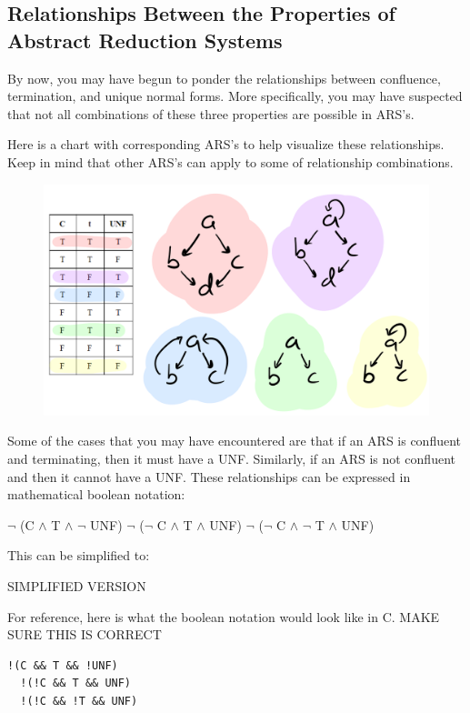 \documentclass{article}
\begin{document}
{\subsection{Relationships Between the Properties of Abstract Reduction Systems}

\medskip\noindent
By now, you may have begun to ponder the relationships between confluence, termination, and unique normal forms. More specifically, you may have suspected that not all combinations of these three properties are possible in ARS’s.

\medskip\noindent
Here is a chart with corresponding ARS's to help visualize these relationships. Keep in mind that other ARS's can apply to some of relationship combinations.

\begin{figure}[h!]
  \centering
  \includegraphics[scale=0.06]{arsComparisonGen}
\end{figure}

\medskip\noindent
Some of the cases that you may have encountered are that if an ARS is confluent and terminating, then it must have a UNF. Similarly, if an ARS is not confluent and then it cannot have a UNF. These relationships can be expressed in mathematical boolean notation:

$\neg$ (C $\land$ T $\land$ $\neg$ UNF)
$\neg$ ($\neg$ C $\land$ T $\land$ UNF)
$\neg$ ($\neg$ C $\land$ $\neg$ T $\land$ UNF)

\medskip\noindent
This can be simplified to:

SIMPLIFIED VERSION

\medskip\noindent
For reference, here is what the boolean notation would look like in C. MAKE SURE THIS IS CORRECT

\begin{lstlisting}[style=CStyle]
  !(C && T && !UNF)
  !(!C && T && UNF)
  !(!C && !T && UNF)
\end{lstlisting}

}
\end{document}

